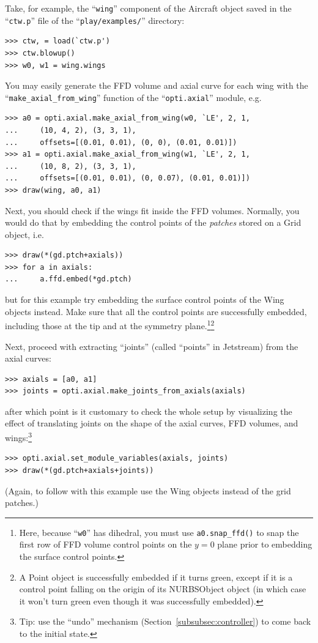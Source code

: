 \documentclass[]{article}
\begin{document}
Take, for example, the ``\texttt{wing}'' component of the Aircraft 
object saved in the ``\texttt{ctw.p}'' file of the 
``\texttt{play/examples/}'' directory:
\begin{verbatim}
>>> ctw, = load(`ctw.p')
>>> ctw.blowup()
>>> w0, w1 = wing.wings
\end{verbatim}
You may easily generate the FFD volume and axial curve for each wing 
with the ``\texttt{make\_axial\_from\_wing}'' function of the 
``\texttt{opti.axial}'' module, e.g.
\begin{verbatim}
>>> a0 = opti.axial.make_axial_from_wing(w0, `LE', 2, 1,
...     (10, 4, 2), (3, 3, 1),
...     offsets=[(0.01, 0.01), (0, 0), (0.01, 0.01)])
>>> a1 = opti.axial.make_axial_from_wing(w1, `LE', 2, 1,
...     (10, 8, 2), (3, 3, 1),
...     offsets=[(0.01, 0.01), (0, 0.07), (0.01, 0.01)])
>>> draw(wing, a0, a1)
\end{verbatim}

Next, you should check if the wings fit inside the FFD volumes.  
Normally, you would do that by embedding the control points of the 
\emph{patches} stored on a Grid object, i.e.\
\begin{verbatim}
>>> draw(*(gd.ptch+axials))
>>> for a in axials:
...     a.ffd.embed(*gd.ptch)
\end{verbatim}
but for this example try embedding the surface control points of the 
Wing objects instead.  Make sure that all the control points are 
successfully embedded, including those at the tip and at the symmetry 
plane.\footnote{Here, because ``\texttt{w0}'' has dihedral, you must use 
\texttt{a0.snap\_ffd()} to snap the first row of FFD volume control 
points on the $y = 0$ plane prior to embedding the surface control 
points.}\footnote{A Point object is successfully embedded if it turns 
green, except if it is a control point falling on the origin of its 
NURBSObject object (in which case it won't turn green even though it was 
successfully embedded).}

Next, proceed with extracting ``joints'' (called ``points'' in 
Jetstream) from the axial curves:
\begin{verbatim}
>>> axials = [a0, a1]
>>> joints = opti.axial.make_joints_from_axials(axials)
\end{verbatim}
after which point is it customary to check the whole setup by 
visualizing the effect of translating joints on the shape of the axial 
curves, FFD volumes, and wings:\footnote{Tip: use the ``undo'' mechanism 
(Section~\ref{subsubsec:controller}) to come back to the initial state.}
\begin{verbatim}
>>> opti.axial.set_module_variables(axials, joints)
>>> draw(*(gd.ptch+axials+joints))
\end{verbatim}
(Again, to follow with this example use the Wing objects instead of the 
grid patches.)
\end{document}
